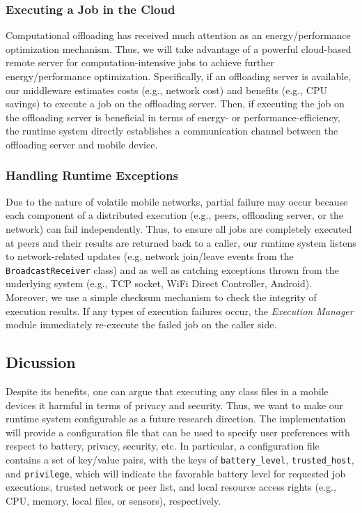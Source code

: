 \documentclass{sig-alternate}
\begin{document}
\subsubsection{Executing a Job in the Cloud}
Computational offloading \cite{kwon+:icsm13} has received much attention as an energy/performance optimization mechanism. Thus, we will take advantage of a powerful cloud-based remote server for computation-intensive jobs to achieve further energy/performance optimization. Specifically, if an offloading server is available, our middleware estimates costs (e.g., network cost) and benefits (e.g., CPU savings) to execute a job on the offloading server. Then, if executing the job on the offloading server is beneficial in terms of energy- or performance-efficiency, the runtime system directly establishes a communication channel between the offloading server and mobile device.

\subsubsection{Handling Runtime Exceptions}
Due to the nature of volatile mobile networks, partial failure may occur because each component of a distributed execution (e.g., peers, offloading server, or the network) can fail independently. Thus, to ensure all jobs are completely executed at peers and their results are returned back to a caller, our runtime system listens to network-related updates (e.g, network join/leave events from the \texttt{BroadcastReceiver} class) and as well as catching exceptions thrown from the underlying system (e.g., TCP socket, WiFi Direct Controller, Android). Moreover, we use a simple checksum mechanism to check the integrity of execution results. If any types of execution failures occur, the \emph{Execution Manager} module immediately re-execute the failed job on the caller side.


\subsection{Dicussion}
Despite its benefits, one can argue that executing any class files in a mobile devices it harmful in terms of privacy and security. Thus, we want to make our runtime system configurable as a future research direction. The implementation will provide a configuration file that can be used to specify user preferences with respect to battery, privacy, security, etc. In particular, a configuration file contains a set of key/value pairs, with the keys of \texttt{battery\_level}, \texttt{trusted\_host}, and \texttt{privilege}, which will indicate the favorable battery level for requested job executions, trusted network or peer list, and local resource access rights (e.g., CPU, memory, local files, or sensors), respectively.
\end{document}
